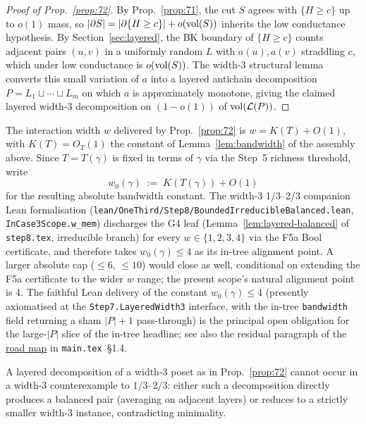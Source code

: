 \begin{proof}[Proof of Prop.~\ref{prop:72}]
By Prop.~\ref{prop:71}, the cut $S$ agrees with $\{H\ge c\}$ up to
$o(1)$ mass, so $|\partial S|=|\partial\{H\ge c\}|+o(\operatorname{vol}(S))$ inherits the
low conductance hypothesis.  By Section~\ref{sec:layered}, the BK
boundary of $\{H\ge c\}$ counts adjacent pairs $(u,v)$ in a uniformly
random $L$ with $a(u),a(v)$ straddling $c$, which under low conductance
is $o(\operatorname{vol}(S))$.  The width-3 structural lemma converts this small
variation of $a$ into a layered antichain decomposition
$P=L_1\sqcup\cdots\sqcup L_m$ on which $a$ is approximately monotone,
giving the claimed layered width-3 decomposition on $(1-o(1))$ of
$\operatorname{vol}(\mathcal{L}(P))$.
\end{proof}

\begin{remark}\label{rem:w0-constant}
The interaction width $w$ delivered by Prop.~\ref{prop:72} is
$w = K(T) + O(1)$, with $K(T) = O_T(1)$ the constant of
Lemma~\ref{lem:bandwidth} of the assembly above. Since
$T = T(\gamma)$ is fixed in terms of $\gamma$ via the Step~5
richness threshold, write
\[
  w_0(\gamma) \;:=\; K(T(\gamma)) + O(1)
\]
for the resulting absolute bandwidth constant. The width-3 1/3--2/3
companion Lean formalisation
(\texttt{lean/OneThird/Step8/BoundedIrreducibleBalanced.lean},
\texttt{InCase3Scope.w\_mem}) discharges the G4 leaf
(Lemma~\ref{lem:layered-balanced} of \texttt{step8.tex}, irreducible
branch) for every $w \in \{1, 2, 3, 4\}$ via the F5a Bool
certificate, and therefore takes $w_0(\gamma) \le 4$ as its in-tree
alignment point. A larger absolute cap ($\le 6$, $\le 10$) would
close as well, conditional on extending the F5a certificate to the
wider $w$ range; the present scope's natural alignment point is
$4$. The faithful Lean delivery of the constant
$w_0(\gamma) \le 4$ (presently axiomatised at the
\texttt{Step7.LayeredWidth3} interface, with the in-tree
\texttt{bandwidth} field returning a sham $|P|+1$ pass-through) is
the principal open obligation for the large-$|P|$ slice of the
in-tree headline; see also the residual paragraph of the
\hyperref[sec:roadmap-residual]{road map} in \texttt{main.tex}~\S1.4.
\end{remark}

\begin{proposition}\label{prop:73}\label{sec:prop73-proof}
A layered decomposition of a width-3 poset as in
Prop.~\ref{prop:72} cannot occur in a width-3 counterexample to
$1/3$--$2/3$: either such a decomposition directly produces a
balanced pair (averaging on adjacent layers) or reduces to a strictly
smaller width-3 instance, contradicting minimality.
\end{proposition}

